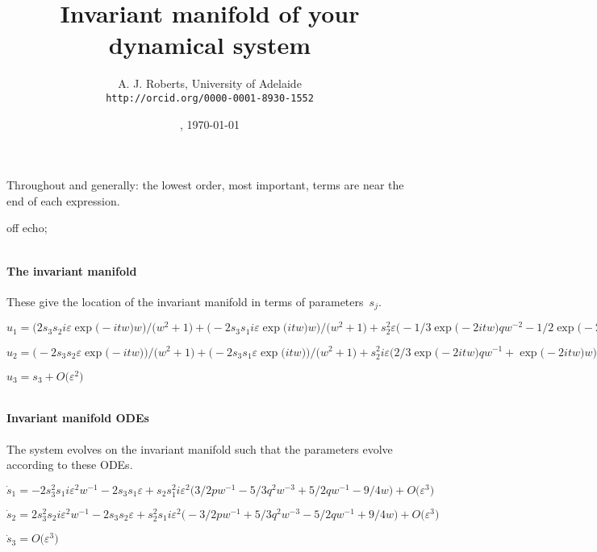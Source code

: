 \documentclass[11pt,a5paper]{article}
\title{Invariant manifold of your dynamical system}
\author{A. J. Roberts, University of Adelaide\\
\texttt{http://orcid.org/0000-0001-8930-1552}}
\date{\now, \today}
\def\eps{\varepsilon} \def\_{_}
\begin{document}
\maketitle
Throughout and generally: the lowest order, most
important, terms are near the end of each expression.


off echo;

\(
\)
\paragraph{The invariant manifold}
These give the location of the invariant manifold in
terms of parameters~\(s\_ j\).
\(
\)\par
\(u_{1}=\big(2 s_{3} s_{2} i \eps \exp \big(-i t w\big) w\big)/\big(w^{2}+
1\big)+\big(-2 s_{3} s_{1} i \eps \exp \big(i t w\big) w\big)/\big(w^{2}
+1\big)+s_{2}^{2} \eps \big(-1/3 \exp \big(-2 i t w\big) q w^{-2}-1/2 
\exp \big(-2 i t w\big)\big)+s_{2} s_{1} \eps \big(2 q w^{-2}-3\big)+s_{
2} \exp \big(-i t w\big)+s_{1}^{2} \eps \big(-1/3 \exp \big(2 i t w\big)
 q w^{-2}-1/2 \exp \big(2 i t w\big)\big)+s_{1} \exp \big(i t w\big)+O
\big(\varepsilon ^{2}\big)
\)\par
\(u_{2}=\big(-2 s_{3} s_{2} \eps \exp \big(-i t w\big)\big)/\big(w^{2}+1
\big)+\big(-2 s_{3} s_{1} \eps \exp \big(i t w\big)\big)/\big(w^{2}+1
\big)+s_{2}^{2} i \eps \big(2/3 \exp \big(-2 i t w\big) q w^{-1}+\exp 
\big(-2 i t w\big) w\big)-s_{2} i \exp \big(-i t w\big) w+s_{1}^{2} i 
\eps \big(-2/3 \exp \big(2 i t w\big) q w^{-1}-\exp \big(2 i t w\big) w
\big)+s_{1} i \exp \big(i t w\big) w+O\big(\varepsilon ^{2}\big)
\)\par
\(u_{3}=s_{3}+O\big(\varepsilon ^{2}\big)
\)\par
\(
\)
\paragraph{Invariant manifold ODEs}
The system evolves on the invariant manifold such
that the parameters evolve according to these ODEs.
\(
\)\par
\(\dot s_{1}=-2 s_{3}^{2} s_{1} i \eps^{2} w^{-1}-2 s_{3} s_{1} \eps+s_{2}
 s_{1}^{2} i \eps^{2} \big(3/2 p w^{-1}-5/3 q^{2} w^{-3}+5/2 q w^{-1}-9/
4 w\big)+O\big(\varepsilon ^{3}\big)
\)\par
\(\dot s_{2}=2 s_{3}^{2} s_{2} i \eps^{2} w^{-1}-2 s_{3} s_{2} \eps+s_{2}
^{2} s_{1} i \eps^{2} \big(-3/2 p w^{-1}+5/3 q^{2} w^{-3}-5/2 q w^{-1}+9
/4 w\big)+O\big(\varepsilon ^{3}\big)
\)\par
\(\dot s_{3}=O\big(\varepsilon ^{3}\big)
\)\par
\(
\)\par
\end{document}
